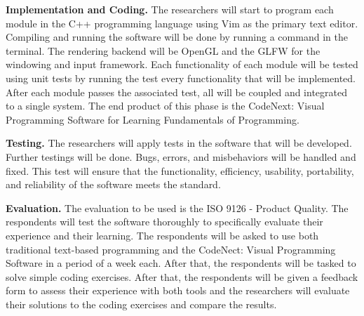 \flushleft
\textbf{Implementation and Coding.}
\justifying
\parx
The researchers will start to program each module in the C++ programming
language using Vim as the primary text editor. Compiling and running the
software will be done by running a command in the terminal. The rendering
backend will be OpenGL and the GLFW for the windowing and input framework. Each
functionality of each module will be tested using unit tests by running the
test every functionality that will be implemented.  After each module passes
the associated test, all will be coupled and integrated to a single system. The
end product of this phase is the CodeNext: Visual Programming Software for
Learning Fundamentals of Programming.

\flushleft
\textbf{Testing.}
\justifying
\parx
The researchers will apply tests in the software that will be developed.
Further testings will be done. Bugs, errors, and misbehaviors will be handled
and fixed. This test will ensure that the functionality, efficiency,
usability, portability, and reliability of the software meets the standard.

\flushleft
\textbf{Evaluation.}
\justifying
\parx
The evaluation to be used is the ISO 9126 - Product Quality. The respondents
will test the software thoroughly to specifically evaluate their experience and
their learning.
The respondents will be asked to use both traditional text-based programming and the
CodeNect: Visual Programming Software in a period of a week each. After that, the
respondents will be tasked to solve simple coding exercises. After that, the
respondents will be given a feedback form to assess their experience with both
tools and the researchers will evaluate their solutions to the coding exercises
and compare the results.
